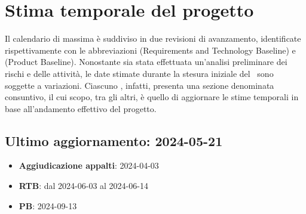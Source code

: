 \section{Stima temporale del progetto}
\label{sec:stima_temporale}

\par Il calendario di massima è suddiviso in due revisioni di avanzamento, identificate rispettivamente con le abbreviazioni  (Requirements and Technology Baseline) e  (Product Baseline). Nonostante sia stata effettuata un'analisi preliminare dei rischi e delle attività, le date stimate durante la stesura iniziale del \PdP\ sono soggette a variazioni. Ciascuno , infatti, presenta una sezione denominata consuntivo, il cui scopo, tra gli altri, è quello di aggiornare le stime temporali in base all'andamento effettivo del progetto.

\subsection{Ultimo aggiornamento: 2024-05-21}
\begin{itemize}
  \item \textbf{Aggiudicazione appalti}: 2024-04-03
  \item \textbf{RTB}: dal 2024-06-03 al 2024-06-14
  \item \textbf{PB}: 2024-09-13
\end{itemize}
